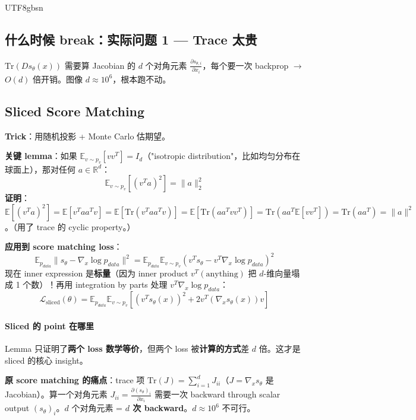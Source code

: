 \documentclass[11pt]{article}
\begin{document}
\begin{CJK}{UTF8}{gbsn}
\subsection{什么时候 break：实际问题 1 --- Trace 太贵}

$\text{Tr}(D s_\theta(x))$ 需要算 Jacobian 的 $d$ 个对角元素 $\frac{\partial s_{\theta,i}}{\partial x_i}$，每个要一次 backprop $\to$ $O(d)$ 倍开销。图像 $d \approx 10^6$，根本跑不动。

\subsection{Sliced Score Matching}

\textbf{Trick}：用随机投影 + Monte Carlo 估期望。

\textbf{关键 lemma}：如果 $\mathbb{E}_{v \sim p_v}[v v^T] = I_d$（"isotropic distribution"，比如均匀分布在球面上），那对任何 $a \in \mathbb{R}^d$：
\[
\mathbb{E}_{v \sim p_v}[(v^T a)^2] = \|a\|_2^2
\]
\textbf{证明}：$\mathbb{E}[(v^T a)^2] = \mathbb{E}[v^T a a^T v] = \mathbb{E}[\text{Tr}(v^T a a^T v)] = \mathbb{E}[\text{Tr}(a a^T v v^T)] = \text{Tr}(a a^T \mathbb{E}[v v^T]) = \text{Tr}(a a^T) = \|a\|^2$。（用了 trace 的 cyclic property。）

\textbf{应用到 score matching loss}：
\[
\mathbb{E}_{p_{data}} \|s_\theta - \nabla_x \log p_{data}\|^2 = \mathbb{E}_{p_{data}} \mathbb{E}_{v \sim p_v} (v^T s_\theta - v^T \nabla_x \log p_{data})^2
\]
现在 inner expression 是\textbf{标量}（因为 inner product $v^T (\text{anything})$ 把 $d$-维向量塌成 1 个数）！再用 integration by parts 处理 $v^T \nabla_x \log p_{data}$：
\[
\mathcal{L}_{\text{sliced}}(\theta) = \mathbb{E}_{p_{data}} \mathbb{E}_{v \sim p_v} \left[(v^T s_\theta(x))^2 + 2 v^T (\nabla_x s_\theta(x)) v\right]
\]
\paragraph{Sliced 的 point 在哪里}

Lemma 只证明了\textbf{两个 loss 数学等价}，但两个 loss 被\textbf{计算的方式}差 $d$ 倍。这才是 sliced 的核心 insight。

\textbf{原 score matching 的痛点}：trace 项 $\text{Tr}(J) = \sum_{i=1}^d J_{ii}$（$J = \nabla_x s_\theta$ 是 Jacobian）。算一个对角元素 $J_{ii} = \frac{\partial (s_\theta)_i}{\partial x_i}$ 需要一次 backward through scalar output $(s_\theta)_i$。$d$ 个对角元素 = \textbf{$d$ 次 backward}。$d \approx 10^6$ 不可行。


\end{CJK}
\end{document}
